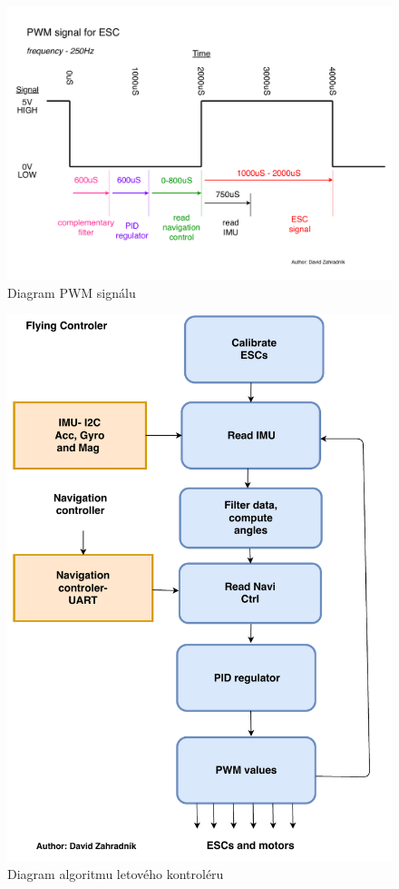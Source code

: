 \begin{figure}[H]
	\centering
	\includegraphics[width=16cm]{pictures/PWMDiagram.pdf}
	\caption{Diagram PWM signálu}
\end{figure}
\begin{figure}[H]
	\centering
	\includegraphics[width=12cm]{pictures/FlyingDiagram.pdf}
	\caption{Diagram algoritmu letového kontroléru}
\end{figure}
